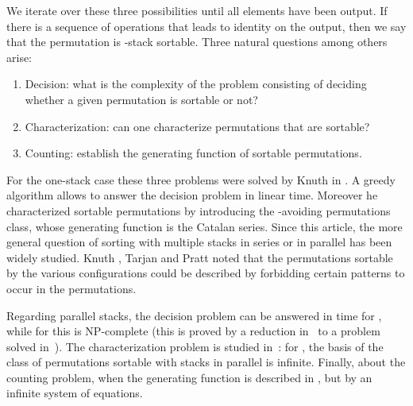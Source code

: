 \documentclass[11pt]{article}
\begin{document}
We iterate over these three possibilities until all elements have been output. 
If there is a sequence of operations that leads to identity on the output, 
then we say that the permutation is -stack sortable. 
Three natural questions among others arise:
\begin{enumerate}
\item Decision: what is the complexity of the problem consisting of deciding whether a given permutation is sortable or not?
\item Characterization: can one characterize permutations that are sortable?
\item Counting: establish the generating function of sortable permutations.
\end{enumerate}

For the one-stack case these three problems were solved by Knuth in \cite{Knuth68}. 
A greedy algorithm allows to answer the decision problem in linear time. 
Moreover he characterized sortable permutations by introducing the -avoiding permutations class, 
whose generating function is the Catalan series. 
Since this article, the more general question of sorting with multiple stacks in series or in parallel has been widely studied.
Knuth \cite{Knuth68}, Tarjan \cite{Tarjan72} and Pratt \cite{Pratt73} noted that the permutations sortable by the various configurations 
could be described by forbidding certain patterns to occur in the permutations.

Regarding  parallel stacks,
the decision problem can be answered in time  for ,
while for  this is NP-complete (this is proved by a reduction in~\cite{EvenItai71} to a problem solved in~\cite{Unger92}).
The characterization problem is studied in~\cite{Pratt73}:
for , the basis of the class of permutations sortable with  stacks in parallel is infinite.
Finally, about the counting problem,
when  the generating function is described in \cite{ABM}, but by an infinite system of equations.
\end{document}
